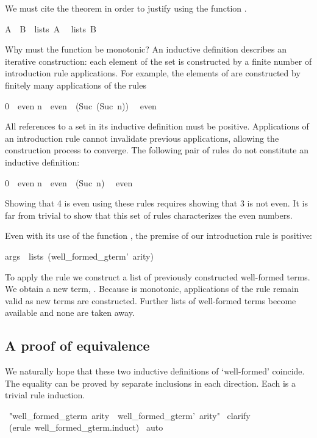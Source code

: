 We must cite the theorem  in order to justify 
using the function . 
\begin{isabelle}
A\ \isasymsubseteq\ B\ \isasymLongrightarrow \ lists\ A\ \isasymsubseteq
\ lists\ B
\end{isabelle}
%
Why must the function be monotonic?  An inductive definition describes
an iterative construction: each element of the set is constructed by a
finite number of introduction rule applications.  For example, the
elements of  are constructed by finitely many applications of
the rules 
\begin{isabelle}
0\ \isasymin \ even\isanewline
n\ \isasymin \ even\ \isasymLongrightarrow \ (Suc\ (Suc\ n))\ \isasymin
\ even
\end{isabelle}
All references to a set in its
inductive definition must be positive.  Applications of an
introduction rule cannot invalidate previous applications, allowing the
construction process to converge.
The following pair of rules do not constitute an inductive definition:
\begin{isabelle}
0\ \isasymin \ even\isanewline
n\ \isasymnotin \ even\ \isasymLongrightarrow \ (Suc\ n)\ \isasymin
\ even
\end{isabelle}
%
Showing that 4 is even using these rules requires showing that 3 is not
even.  It is far from trivial to show that this set of rules
characterizes the even numbers.  

Even with its use of the function , the premise of our
introduction rule is positive:
\begin{isabelle}
args\ \isasymin \ lists\ (well_formed_gterm'\ arity)
\end{isabelle}
To apply the rule we construct a list  of previously
constructed well-formed terms.  We obtain a
new term, .  Because  is monotonic,
applications of the rule remain valid as new terms are constructed.
Further lists of well-formed
terms become available and none are taken away.


\subsection{A proof of equivalence}

We naturally hope that these two inductive definitions of `well-formed' 
coincide.  The equality can be proved by separate inclusions in 
each direction.  Each is a trivial rule induction. 
\begin{isabelle}
\ "well_formed_gterm\ arity\ \isasymsubseteq \ well_formed_gterm'\ arity"\isanewline
{}\ clarify\isanewline
{}\ (erule\ well_formed_gterm.induct)\isanewline
{}\ auto\isanewline
{}
\end{isabelle}

